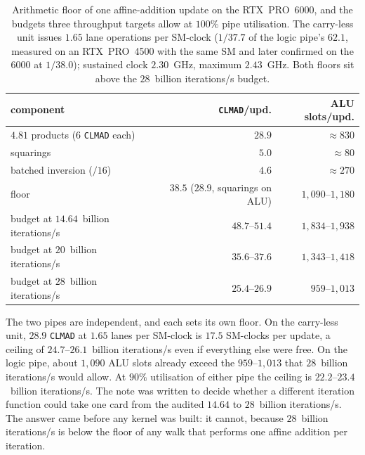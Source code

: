 \begin{table}[t]
\centering
\small
\caption{Arithmetic floor of one affine-addition update on the
  RTX~PRO~6000, and the budgets three throughput targets allow at
  $100\%$ pipe utilisation. The carry-less unit issues $1.65$ lane operations per SM-clock
  ($1/37.7$ of the logic pipe's $62.1$, measured on an RTX~PRO~4500 with
  the same SM and later confirmed on the 6000 at $1/38.0$); sustained
  clock $2.30$~GHz, maximum $2.43$~GHz. Both floors sit
  above the $28$~billion iterations/s budget.}
\label{tab:floor}
\begin{tabular}{@{}lrr@{}}
\toprule
component & \texttt{CLMAD}/upd. & ALU slots/upd. \\
\midrule
$4.81$ products ($6$ \texttt{CLMAD} each) & $28.9$ & $\approx 830$ \\
squarings & $5.0$ & $\approx 80$ \\
batched inversion ($/16$) & $4.6$ & $\approx 270$ \\
\midrule
floor & $38.5$ ($28.9$, squarings on ALU) & $1{,}090$--$1{,}180$ \\
\midrule
budget at $14.64$~billion iterations/s & $48.7$--$51.4$ & $1{,}834$--$1{,}938$ \\
budget at $20$~billion iterations/s & $35.6$--$37.6$ & $1{,}343$--$1{,}418$ \\
budget at $28$~billion iterations/s & $25.4$--$26.9$ & $959$--$1{,}013$ \\
\bottomrule
\end{tabular}
\end{table}

The two pipes are independent, and each sets its own floor. On the
carry-less unit, $28.9$ \texttt{CLMAD} at $1.65$ lanes per SM-clock is
$17.5$ SM-clocks per update, a ceiling of $24.7$--$26.1$~billion iterations/s even if
everything else were free. On the logic pipe, about $1{,}090$ ALU slots
already exceed the $959$--$1{,}013$ that $28$~billion iterations/s would allow. At $90\%$
utilisation of either pipe the ceiling is $22.2$--$23.4$~billion iterations/s. The note
was written to decide whether a different iteration function could
take one card from the audited $14.64$ to $28$~billion iterations/s. The
answer came before any kernel was built: it cannot, because $28$~billion iterations/s
is below the floor of any walk that performs one affine addition per
iteration.

